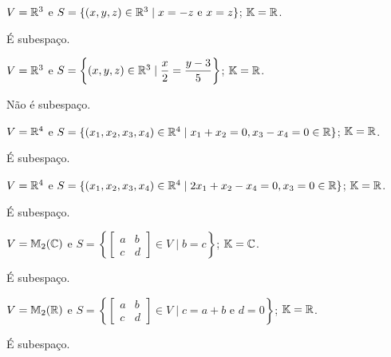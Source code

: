 \documentclass[12pt]{exam}
\begin{document}
\begin{exercicio}
	$V = \mathbb{R}^3$ e $S = \{(x, y, z) \in \mathbb{R}^3 \mid x = -z \mbox{ e } x = z\}$; $\mathbb{K} = \mathbb{R}$.
	\begin{solucao}
		\'E subespa\c{c}o.
	\end{solucao}
\end{exercicio}

\begin{exercicio}
	$V = \mathbb{R}^3$ e $S = \left\{(x, y, z) \in \mathbb{R}^3 \mid \dfrac{x}{2} = \dfrac{y - 3}{5}\right\}$; $\mathbb{K} = \mathbb{R}$.
	\begin{solucao}
		N\~ao \'e subespa\c{c}o.
	\end{solucao}
\end{exercicio}

\begin{exercicio}
	$V = \mathbb{R}^4$ e $S = \{(x_1, x_2, x_3, x_4) \in \mathbb{R}^4 \mid x_1 + x_2 = 0, x_3 - x_4 = 0 \in \mathbb{R}\}$; $\mathbb{K} = \mathbb{R}$.
	\begin{solucao}
		\'E subespa\c{c}o.
	\end{solucao}
\end{exercicio}

\begin{exercicio}
	$V = \mathbb{R}^4$ e $S = \{(x_1, x_2, x_3, x_4) \in \mathbb{R}^4 \mid 2x_1 + x_2 - x_4 = 0, x_3 = 0 \in \mathbb{R}\}$; $\mathbb{K} = \mathbb{R}$.
	\begin{solucao}
		\'E subespa\c{c}o.
	\end{solucao}
\end{exercicio}

\begin{exercicio}
	$V = \mathbb{M}_2(\mathbb{C})$ e $S = \left\{\begin{bmatrix} a & b\\ c & d\end{bmatrix} \in V \mid b = c\right\}$; $\mathbb{K} = \mathbb{C}$.
	\begin{solucao}
		\'E subespa\c{c}o.
	\end{solucao}
\end{exercicio}

\begin{exercicio}
	$V = \mathbb{M}_2(\mathbb{R})$ e $S = \left\{\begin{bmatrix} a & b\\ c & d\end{bmatrix} \in V \mid c = a + b \mbox{ e } d = 0\right\}$; $\mathbb{K} = \mathbb{R}$.
	\begin{solucao}
		\'E subespa\c{c}o.
	\end{solucao}
\end{exercicio}
\end{document}
